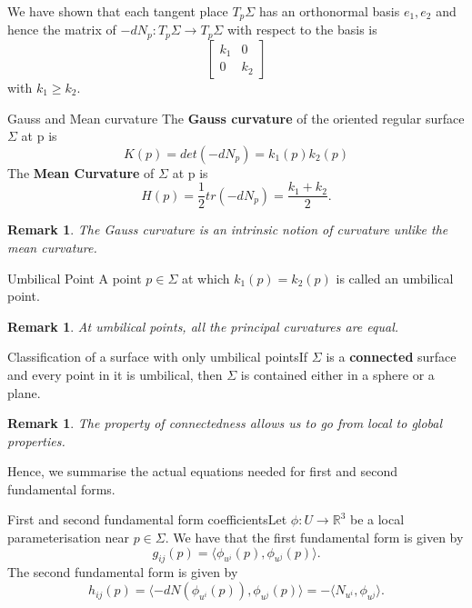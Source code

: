 \documentclass[twoside]{article}
\newtheorem{remark}[theorem]{Remark}
\begin{document}
We have shown that each tangent place $T_p\Sigma$ has an orthonormal basis $e_1,e_2$ and hence the matrix of $-dN_p: T_p\Sigma \rightarrow T_p\Sigma$ with respect to the basis is 
$$
\begin{bmatrix}k_1 & 0 \\ 0 & k_2 \end{bmatrix}
$$
with $k_1 \geq k_2.$\\

\begin{definition_exam}{Gauss and Mean curvature}{} The \textbf{Gauss curvature} of the oriented regular surface $\Sigma$ at p is 
$$
K(p) = det(-dN_p) = k_1(p)k_2(p)
$$
The \textbf{Mean Curvature} of $\Sigma$ at p is
$$
H(p) = \frac{1}{2}tr(-dN_p) = \frac{k_1 + k_2}{2}.
$$
\end{definition_exam}

\begin{remark}The Gauss curvature is an intrinsic notion of curvature unlike the mean curvature.
\end{remark}

\begin{definition_exam}{Umbilical Point}{} A point $p \in \Sigma$ at which $k_1(p) = k_2(p)$ is called an umbilical point.
\end{definition_exam}
\begin{remark}At umbilical points, all the principal curvatures are equal.
\end{remark}

\begin{proposition_exam}{Classification of a surface with only umbilical points}{}If $\Sigma$ is a \textbf{connected} surface and every point in it is umbilical, then $\Sigma$ is contained either in a sphere or a plane.
\end{proposition_exam}

\begin{remark}The property of connectedness allows us to go from local to global properties.
\end{remark}

Hence, we summarise the actual equations needed for first and second fundamental forms.
\begin{theorem_exam}{First and second fundamental form coefficients}{}Let $\phi:U \rightarrow \mathbb{R}^3$ be a local parameterisation near $p \in \Sigma$. We have that the first fundamental form is given by 
$$
g_{ij}(p) = \langle \phi_{u^{i}}(p), \phi_{u^{j}}(p) \rangle.
$$
The second fundamental form is given by 
$$
h_{ij}(p) = \langle -dN(\phi_{u^{i}}(p)), \phi_{u^{j}}(p) \rangle = -\langle N_{u^{i}}, \phi_{u^{j}} \rangle.
$$
\end{theorem_exam}
\end{document}
